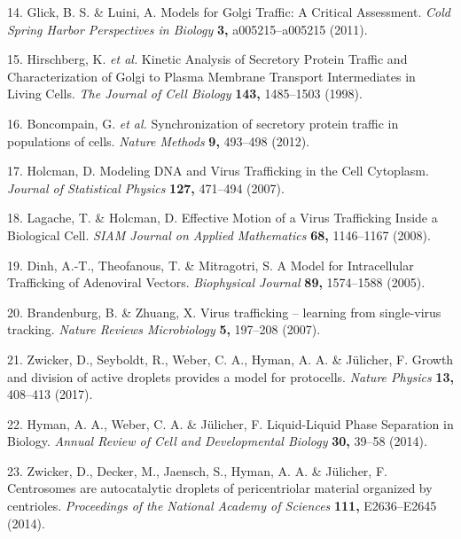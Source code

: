 \documentclass{Dissertate}
\begin{document}
\leavevmode\hypertarget{ref-glick_models_2011}{}%
14. Glick, B. S. \& Luini, A. Models for Golgi Traffic: A Critical
Assessment. \emph{Cold Spring Harbor Perspectives in Biology}
\textbf{3,} a005215--a005215 (2011).

\leavevmode\hypertarget{ref-hirschberg_kinetic_1998}{}%
15. Hirschberg, K. \emph{et al.} Kinetic Analysis of Secretory Protein
Traffic and Characterization of Golgi to Plasma Membrane Transport
Intermediates in Living Cells. \emph{The Journal of Cell Biology}
\textbf{143,} 1485--1503 (1998).

\leavevmode\hypertarget{ref-boncompain_synchronization_2012}{}%
16. Boncompain, G. \emph{et al.} Synchronization of secretory protein
traffic in populations of cells. \emph{Nature Methods} \textbf{9,}
493--498 (2012).

\leavevmode\hypertarget{ref-holcman_modeling_2007}{}%
17. Holcman, D. Modeling DNA and Virus Trafficking in the Cell
Cytoplasm. \emph{Journal of Statistical Physics} \textbf{127,} 471--494
(2007).

\leavevmode\hypertarget{ref-lagache_effective_2008}{}%
18. Lagache, T. \& Holcman, D. Effective Motion of a Virus Trafficking
Inside a Biological Cell. \emph{SIAM Journal on Applied Mathematics}
\textbf{68,} 1146--1167 (2008).

\leavevmode\hypertarget{ref-dinh_model_2005}{}%
19. Dinh, A.-T., Theofanous, T. \& Mitragotri, S. A Model for
Intracellular Trafficking of Adenoviral Vectors. \emph{Biophysical
Journal} \textbf{89,} 1574--1588 (2005).

\leavevmode\hypertarget{ref-brandenburg_virus_2007}{}%
20. Brandenburg, B. \& Zhuang, X. Virus trafficking -- learning from
single-virus tracking. \emph{Nature Reviews Microbiology} \textbf{5,}
197--208 (2007).

\leavevmode\hypertarget{ref-zwicker_growth_2017}{}%
21. Zwicker, D., Seyboldt, R., Weber, C. A., Hyman, A. A. \& Jülicher,
F. Growth and division of active droplets provides a model for
protocells. \emph{Nature Physics} \textbf{13,} 408--413 (2017).

\leavevmode\hypertarget{ref-hyman_liquid-liquid_2014}{}%
22. Hyman, A. A., Weber, C. A. \& Jülicher, F. Liquid-Liquid Phase
Separation in Biology. \emph{Annual Review of Cell and Developmental
Biology} \textbf{30,} 39--58 (2014).

\leavevmode\hypertarget{ref-zwicker_centrosomes_2014}{}%
23. Zwicker, D., Decker, M., Jaensch, S., Hyman, A. A. \& Jülicher, F.
Centrosomes are autocatalytic droplets of pericentriolar material
organized by centrioles. \emph{Proceedings of the National Academy of
Sciences} \textbf{111,} E2636--E2645 (2014).
\end{document}
